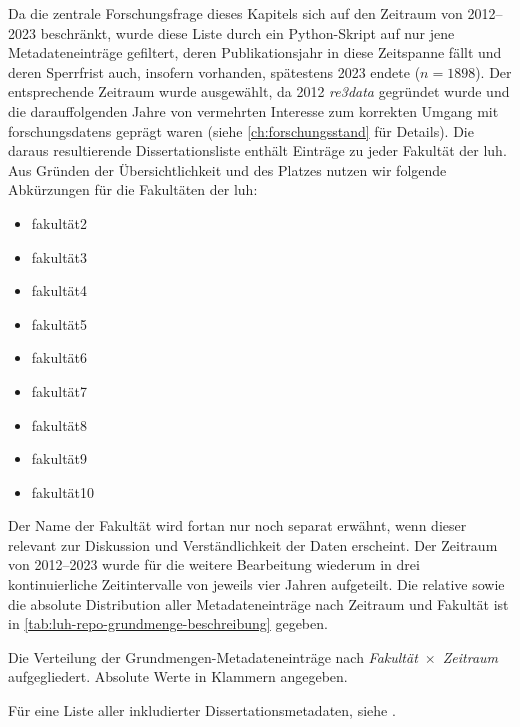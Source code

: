 Da die zentrale Forschungsfrage dieses Kapitels sich auf den Zeitraum von 2012--2023 beschränkt, wurde diese Liste durch ein Python-Skript \autocite{my-dataset} auf nur jene Metadateneinträge gefiltert, deren Publikationsjahr in diese Zeitspanne fällt und deren Sperrfrist auch, insofern vorhanden, spätestens 2023 endete ($n=1898$).
Der entsprechende Zeitraum wurde ausgewählt, da 2012 \textit{re3data} gegründet wurde \autocite{Pampel2013} und die darauffolgenden Jahre von vermehrten Interesse zum korrekten Umgang mit \glspl{forschungsdaten} geprägt waren (siehe \cref{ch:forschungsstand} für Details).
Die daraus resultierende Dissertationsliste enthält Einträge zu jeder Fakultät der \gls{luh}.
Aus Gründen der Übersichtlichkeit und des Platzes nutzen wir folgende Abkürzungen für die Fakultäten der \gls{luh}:
\begin{itemize}
    \item \gls{fakultät2}
    \item \gls{fakultät3}
    \item \gls{fakultät4}
    \item \gls{fakultät5}
    \item \gls{fakultät6}
    \item \gls{fakultät7}
    \item \gls{fakultät8}
    \item \gls{fakultät9}
    \item \gls{fakultät10}
\end{itemize}
Der Name der Fakultät wird fortan nur noch separat erwähnt, wenn dieser relevant zur Diskussion und Verständlichkeit der Daten erscheint.
Der Zeitraum von 2012--2023 wurde für die weitere Bearbeitung wiederum in drei kontinuierliche Zeitintervalle von jeweils vier Jahren aufgeteilt.
Die relative sowie die absolute Distribution aller Metadateneinträge nach Zeitraum und Fakultät ist in \cref{tab:luh-repo-grundmenge-beschreibung} gegeben.
\begin{table}[!htbp]
	\caption{Die Verteilung der Grundmengen-Metadateneinträge nach \textit{Fakultät}~$\times$~\textit{Zeitraum} aufgegliedert.
    Absolute Werte in Klammern angegeben.}
    
	\label{tab:luh-repo-grundmenge-beschreibung}
\end{table}

\noindent Für eine Liste aller inkludierter Dissertationsmetadaten, siehe \autocite{my-dataset}.


